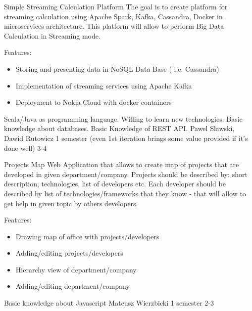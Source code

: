\begin{project}
{Simple Streaming Calculation Platform}
{The goal is to create platform for streaming calculation using Apache Spark, Kafka, Cassandra, Docker in microservices architecture. This platform will allow to perform Big Data Calculation in Streaming mode.} 
{
Features:
\begin{itemize}
	\item Storing and presenting data in NoSQL Data Base ( i.e. Cassandra)
	\item Implementation of streaming services using Apache Kafka
	\item Deployment to Nokia Cloud with docker containers
\end{itemize}
}
{Scala/Java as programming language. Willing to learn new technologies. Basic knowledge about databases. Basic Knowledge of REST API.}
{Pawel Slawski, Dawid Rutowicz}
{1 semester (even 1st iteration brings some value provided if it's done well)}
{3-4}
\end{project}
\begin{project}
{Projects Map}
{Web Application that allows to create map of projects that are developed in given department/company. Projects should be described by: short description, technologies, list of developers etc. Each developer should  be described by list of technologies/frameworks that they know - that will allow to get help in given topic by others developers.} 
{
Features:
\begin{itemize}
	\item Drawing map of office with projects/developers
	\item Adding/editing projects/developers
	\item Hierarchy view of department/company
	\item Adding/editing department/company
\end{itemize}
}
{Basic knowledge about Javascript}
{Mateusz Wierzbicki}
{1 semester}
{2-3}
\end{project}
